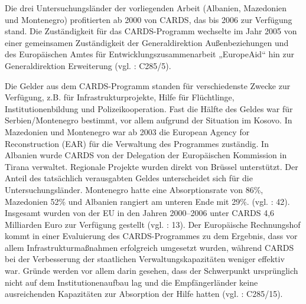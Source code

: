 Die drei Untersuchungsländer der vorliegenden Arbeit (Albanien, Mazedonien und Montenegro) profitierten ab 2000 von CARDS, das bis 2006 zur Verfügung stand. Die Zuständigkeit für das CARDS-Programm wechselte im Jahr 2005 von einer gemeinsamen Zuständigkeit der Generaldirektion Außenbeziehungen und des Europäischen Amtes für Entwicklungszusammenarbeit „EuropeAid“ hin zur Generaldirektion Erweiterung (vgl. \cite{eurrh} : C285/5).\par
Die Gelder aus dem CARDS-Programm standen für verschiedenste Zwecke zur Verfügung, z.B. für Infrastrukturprojekte, Hilfe für Flüchtlinge, Institutionenbildung und Polizeikooperation. Fast die Hälfte des Geldes war für Serbien/Montenegro bestimmt, vor allem aufgrund der Situation im Kosovo. In Mazedonien und Montenegro war ab 2003 die European Agency for Reconstruction (EAR) für die Verwaltung des Programmes zuständig. In Albanien wurde CARDS von der Delegation der Europäischen Kommission in Tirana verwaltet. Regionale Projekte wurden direkt von Brüssel unterstützt. Der Anteil des tatsächlich verausgabten Geldes unterscheidet sich für die Untersuchungsländer. Montenegro hatte eine Absorptionsrate von 86\%, Mazedonien 52\% und Albanien rangiert am unteren Ende mit 29\%. (vgl. \cite{inotai} : 42). Insgesamt wurden von der EU in den Jahren 2000–2006 unter CARDS 4,6 Milliarden Euro zur Verfügung gestellt (vgl. \cite{mus} : 13). Der Europäische Rechnungshof kommt in einer Evaluierung des CARDS-Programmes zu dem Ergebnis, dass vor allem Infrastrukturmaßnahmen erfolgreich umgesetzt wurden, während CARDS bei der Verbesserung der staatlichen Verwaltungskapazitäten weniger effektiv war. Gründe werden vor allem darin gesehen, dass der Schwerpunkt ursprünglich nicht auf dem Institutionenaufbau lag und die Empfängerländer keine ausreichenden Kapazitäten zur Absorption der Hilfe hatten (vgl. \cite{eurrh} : C285/15).
